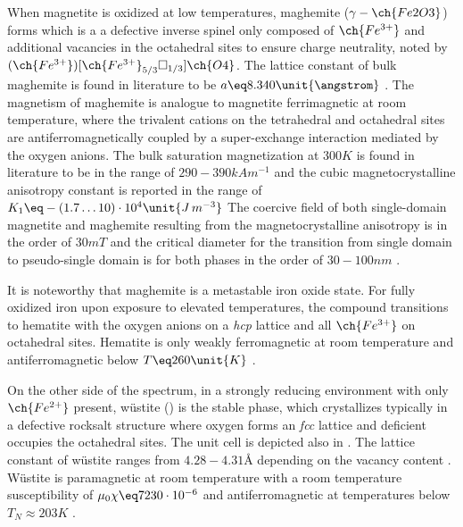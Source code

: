 \documentclass[\main/dresen_thesis.tex]{subfiles}
\begin{document}
  When magnetite is oxidized at low temperatures, maghemite ($\gamma-\ch{Fe2O3}$) forms which is a a defective inverse spinel only composed of $\ch{Fe^{3+}}$ and additional vacancies in the octahedral sites to ensure charge neutrality, noted by $(\ch{Fe^{3+}})[\ch{Fe^{3+}}_{5/3}\square_{1/3}]\ch{O4}$.
  The lattice constant of bulk maghemite is found in literature to be $a \eq 8.340 \unit{\angstrom}$ \cite{Cornell_2003_Their}.
  The magnetism of maghemite is analogue to magnetite ferrimagnetic at room temperature, where the trivalent cations on the tetrahedral and octahedral sites are antiferromagnetically coupled by a super-exchange interaction mediated by the oxygen anions.
  The bulk saturation magnetization at $300 \unit{K}$ is found in literature to be in the range of $290 - 390 \unit{kA m^{-1}}$ and the cubic magnetocrystalline anisotropy constant is reported in the range of $K_1 \eq -(1.7 \ldots 10) \cdot 10^{4} \unit{J \, m^{-3}}$ \cite{Cornell_2003_Their}
  The coercive field of both single-domain magnetite and maghemite resulting from the magnetocrystalline anisotropy is in the order of $30 \unit{mT}$ and the critical diameter for the transition from single domain to pseudo-single domain is for both phases in the order of $30 - 100 \unit{nm}$ \cite{Cornell_2003_Their}.

  It is noteworthy that maghemite is a metastable iron oxide state.
  For fully oxidized iron upon exposure to elevated temperatures, the compound transitions to hematite with the oxygen anions on a \textit{hcp} lattice and all $\ch{Fe^{3+}}$ on octahedral sites.
  Hematite is only weakly ferromagnetic at room temperature and antiferromagnetic below $T \eq 260 \unit{K}$ \cite{Cornell_2003_Their}.

  On the other side of the spectrum, in a strongly reducing environment with only $\ch{Fe^{2+}}$ present, w\"ustite () is the stable phase, which crystallizes typically in a defective rocksalt structure where oxygen forms an \textit{fcc} lattice and deficient  occupies the octahedral sites.
  The unit cell is depicted also in .
  The lattice constant of w\"ustite ranges from $4.28 - 4.31 \unit{\angstrom}$ depending on the vacancy content \cite{Cornell_2003_Their}.
  W\"ustite is paramagnetic at room temperature with a room temperature susceptibility of $\mu_0 \chi \eq 7230 \cdot 10^{-6}$ \cite{Lide_2004_Handb} and antiferromagnetic at temperatures below $T_N \approx 203 K$ \cite{Cornell_2003_Their}.
\end{document}
